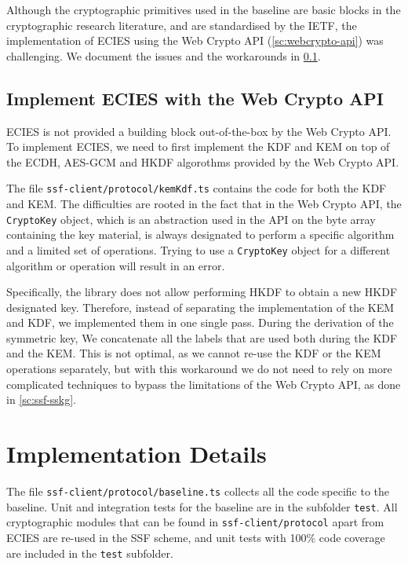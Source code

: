 Although the cryptographic primitives used in the baseline are
basic blocks in the cryptographic research literature,
and are standardised by the IETF, the implementation of
ECIES using the Web Crypto API (\cref{sc:webcrypto-api}) was challenging.
We document the issues and the workarounds in \cref{sc:implement-ecies}.

\subsection{Implement ECIES with the Web Crypto API}\label{sc:implement-ecies}

ECIES is not provided a building block out-of-the-box by the Web Crypto API.
To implement ECIES, we need to first implement 
the KDF and KEM on top of the ECDH, AES-GCM and HKDF algorothms provided
by the Web Crypto API.

The file \texttt{ssf-client/protocol/kemKdf.ts} contains the code for both the KDF and KEM.
The difficulties are rooted in the fact that
in the Web Crypto API, the \texttt{CryptoKey}
object, which is an abstraction used in the API on the byte array containing the key material,
is always designated to perform a specific algorithm and
a limited set of operations.
Trying to use a \texttt{CryptoKey} object for a different algorithm or operation
will result in an error.

Specifically, the library does not allow performing 
HKDF to obtain a new HKDF designated key.
Therefore, instead of separating the implementation
of the KEM and KDF, we implemented them in one single pass.
During the derivation of the symmetric key,
We concatenate all the labels that are used both
during the KDF and the KEM. This is not optimal,
as we cannot re-use the KDF or the KEM operations
separately, but with this workaround we do not need
to rely on more complicated techniques 
to bypass the limitations of the Web Crypto API,
as done in \cref{sc:ssf-sskg}.

\section{Implementation Details}\label{sc:baseline-protocol}

The file \texttt{ssf-client/protocol/baseline.ts} collects all the code specific to the baseline.
Unit and integration tests for the baseline are in the subfolder \texttt{test}.
All cryptographic modules that can be found in
\texttt{ssf-client/protocol} apart from ECIES are re-used in the SSF scheme,
and unit tests with 100\% code coverage are included in the
\texttt{test} subfolder.

